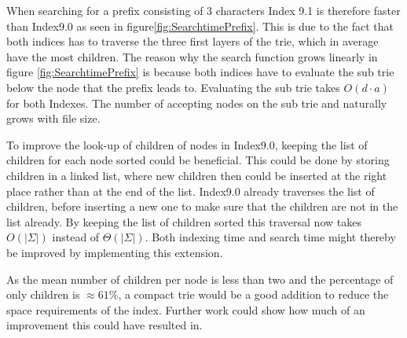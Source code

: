 When searching for a prefix consisting of 3 characters Index 9.1 is therefore faster than Index9.0 as seen in figure\ref{fig:SearchtimePrefix}. This is due to the fact that both indices has to traverse the three first layers of the trie, which in average have the most children. The reason why the search function grows linearly in figure \ref{fig:SearchtimePrefix} is because both indices have to evaluate the sub trie below the node that the prefix leads to. Evaluating the sub trie takes $O(d\cdot a)$ for both Indexes. The number of accepting nodes on the sub trie and naturally grows with file size. 

To improve the look-up of children of nodes in Index9.0, keeping the list of children for each node sorted could be beneficial. This could be done by storing children in a linked list, where new children then could be inserted at the right place rather than at the end of the list. Index9.0 already traverses the list of children, before inserting a new one to make sure that the children are not in the list already. By keeping the list of children sorted this traversal now takes $O(|\Sigma|)$ instead of $\Theta(|\Sigma|)$. Both indexing time and search time might thereby be improved by implementing this extension.

As the mean number of children per node is less than two and the percentage of only children is $\approx 61\%$, a compact trie would be a good addition to reduce the space requirements of the index. Further work could show how much of an improvement this could have resulted in. 
